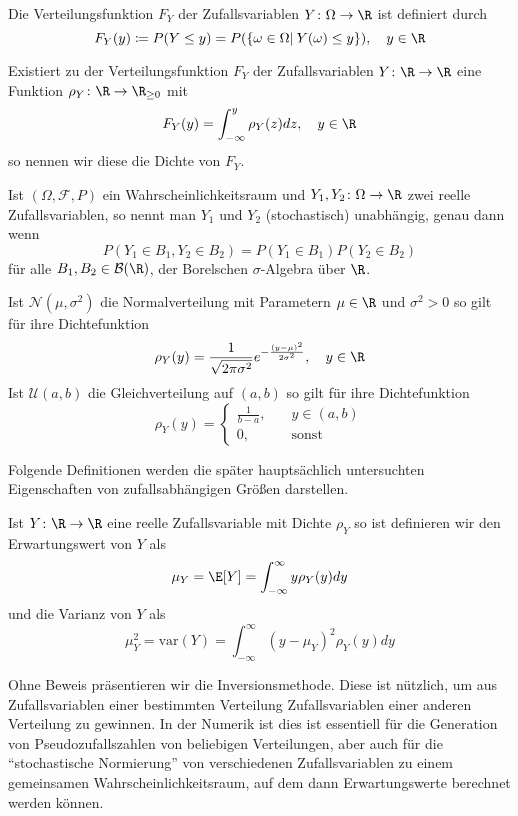 \begin{mathdef}[Verteilungsfunktion]
Die Verteilungsfunktion $F_Y$ der Zufallsvariablen $Y\colon\Omega\to\R$ ist definiert durch
\[F_Y(y)\coloneqq P(Y\le y)=P(\left\lbrace \omega\in\Omega |\: Y(\omega)\le y\right\rbrace),\quad y\in\R\]
\end{mathdef}
\begin{mathdef}
Existiert zu der Verteilungsfunktion $F_Y$ der Zufallsvariablen $Y\colon\R\to\R$ eine Funktion $\rho_Y\colon\R\to\R_{\ge 0}$ mit
\[F_Y(y)=\int_{-\infty}^y\rho_Y(z)dz,\quad y\in\R\]
so nennen wir diese die Dichte von $F_Y$.
\end{mathdef}
\begin{mathdef}
Ist $(\Omega,\mathcal{F},P)$ ein Wahrscheinlichkeitsraum und $Y_1, Y_2\colon \Omega\to\R$ zwei reelle Zufallsvariablen, so nennt man $Y_1$ und $Y_2$ (stochastisch) unabhängig, genau dann wenn
\[P(Y_1\in B_1,Y_2\in B_2)=P(Y_1\in B_1)P(Y_2\in B_2)\]
für alle $B_1,B_2\in \mathcal{B}(\R)$, der Borelschen $\sigma$-Algebra über $\R$.
\end{mathdef}
\begin{mathbsp}
Ist $\mathcal{N}(\mu, \sigma^2)$ die Normalverteilung mit Parametern $\mu\in\R$ und $\sigma^2>0$ so gilt für ihre Dichtefunktion
\[\rho_Y(y)=\frac{1}{\sqrt{2\pi\sigma^2}}e^{-\frac{(y-\mu)^2}{2\sigma^2}},\quad y\in\R\]
Ist $\mathcal{U}(a,b)$ die Gleichverteilung auf $(a,b)$ so gilt für ihre Dichtefunktion
\[\rho_Y(y)=\begin{cases}\frac{1}{b-a},\quad &y\in (a,b)\\ 0, \quad &\text{sonst} \end{cases}\]
\end{mathbsp}
Folgende Definitionen werden die später hauptsächlich untersuchten Eigenschaften von zufallsabhängigen Größen darstellen.
\begin{mathdef}
Ist $Y\colon\R\to\R$ eine reelle Zufallsvariable mit Dichte $\rho_Y$ so ist definieren wir den Erwartungswert von $Y$ als
\[\mu_Y=\E[Y]=\int_{-\infty}^\infty y\rho_Y(y)dy\]
und die Varianz von $Y$ als 
\[\mu_Y^2=\text{var}(Y)=\int_{-\infty}^\infty (y-\mu_Y)^2\rho_Y(y)dy\]
\end{mathdef}
Ohne Beweis präsentieren wir die Inversionsmethode. Diese ist nützlich, um aus Zufallsvariablen einer bestimmten Verteilung Zufallsvariablen einer anderen Verteilung zu gewinnen. In der Numerik ist dies ist essentiell für die Generation von Pseudozufallszahlen von beliebigen Verteilungen, aber auch für die "`stochastische Normierung"' von verschiedenen Zufallsvariablen zu einem gemeinsamen Wahrscheinlichkeitsraum, auf dem dann Erwartungswerte berechnet werden können.
